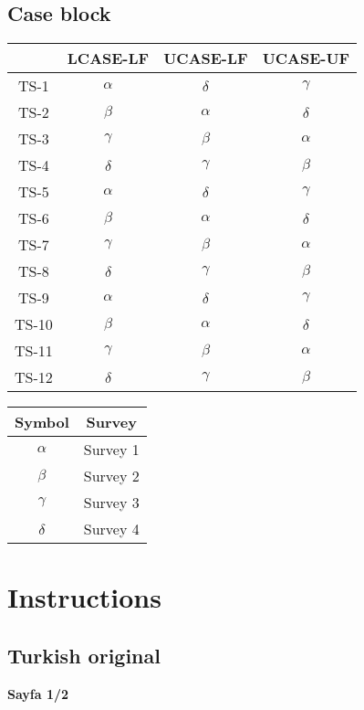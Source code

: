 \subsection{Case block}

\begin{tabular}{|c|c|c|c|}
	\hline
	 & \textbf{LCASE-LF} & \textbf{UCASE-LF} & \textbf{UCASE-UF} \\ \hline
	TS-1 & $\alpha$ & $\delta$ & $\gamma$ \\ \hline
	TS-2 & $\beta$ & $\alpha$ & $\delta$ \\ \hline
	TS-3 & $\gamma$ & $\beta$ & $\alpha$ \\ \hline
	TS-4 & $\delta$ & $\gamma$ & $\beta$ \\ \hline
	TS-5 & $\alpha$ & $\delta$ & $\gamma$ \\ \hline
	TS-6 & $\beta$ & $\alpha$ & $\delta$ \\ \hline
	TS-7 & $\gamma$ & $\beta$ & $\alpha$ \\ \hline
	TS-8 & $\delta$ & $\gamma$ & $\beta$ \\ \hline
	TS-9 & $\alpha$ & $\delta$ & $\gamma$ \\ \hline
	TS-10 & $\beta$ & $\alpha$ & $\delta$ \\ \hline
	TS-11 & $\gamma$ & $\beta$ & $\alpha$ \\ \hline
	TS-12 & $\delta$ & $\gamma$ & $\beta$ \\ \hline
\end{tabular}
\quad
\begin{tabular}{|c|c|}
	\hline
	\textbf{Symbol} & \textbf{Survey} \\ \hline
	$\alpha$ & Survey 1 \\ \hline
	$\beta$ & Survey 2 \\ \hline
	$\gamma$ & Survey 3 \\ \hline
	$\delta$ & Survey 4 \\ \hline
\end{tabular}

\section{Instructions} \label{app:instruct}
\subsection{Turkish original}

\begin{center}
	\large \textbf{Sayfa 1/2}
\end{center}


